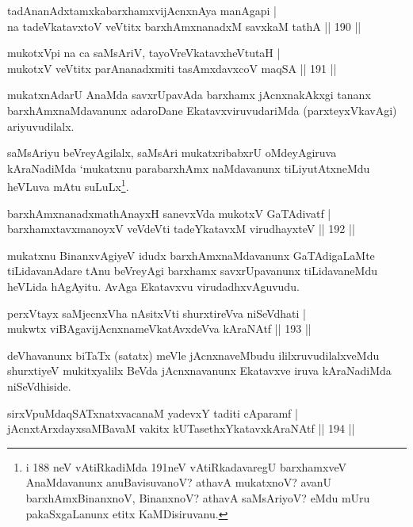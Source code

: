 \begin{shl}
tadAnanAdxtamxkabarxhamxvijAcnxnAya manAgapi |\\
na tadeVkatavxtoV veVtitx barxhAmx\s \s nanadxM savxkaM tathA \hfill || 190 ||
\end{shl}

\begin{shl}
mukotxV\s pi na ca saMsAriV, tayoVreVkatavxheVtutaH |\\
mukotxV veVtitx parAnanadxmiti tasAmxdavxcoV maqSA \hfill || 191 ||
\end{shl}

\begin{artha}
mukatxnAdarU AnaMda savxrUpavAda barxhamx jAcnxnakAkxgi tananx barxhAmxnaMdavanunx adaroDane EkatavxviruvudariMda (parxteyxVkavAgi) ariyuvudilalx.

saMsAriyu beVreyAgilalx, saMsAri mukatxribabxrU oMdeyAgiruva kAraNadiMda `mukatxnu parabarxhAmx naMdavanunx tiLiyutAtxneMdu heVLuva mAtu suLuLx\footnote{i 188 neV vAtiRkadiMda 191neV vAtiRkadavaregU barxhamxveV AnaMdavanunx anuBavisuvanoV? athavA mukatxnoV? avanU barxhAmxBinanxnoV, BinanxnoV? athavA saMsAriyoV? eMdu mUru pakaSxgaLanunx etitx KaMDisiruvanu.}.
\end{artha}

\begin{shl}
barxhAmxnanadxmathAnayxH sanevxVda mukotxV GaTAdivatf |\\
barxhamxtavxmanoyxV veVdeVti tadeYkatavxM virudhayxteV \hfill || 192 ||
\end{shl}

\begin{artha}%
mukatxnu BinanxvAgiyeV idudx barxhAmxnaMdavanunx GaTAdigaLaMte tiLidavanAdare tAnu beVreyAgi barxhamx savxrUpavanunx tiLidavaneMdu heVLida hAgAyitu. AvAga Ekatavxvu virudadhxvAguvudu.
\end{artha}

\begin{shl}
perxVtayx saMjecnxVha nAsitxVti shurxtireVva niSeVdhati |\\
mukwtx viBAgavijAcnxnameVkatAvxdeVva kAraNAtf \hfill || 193 ||
\end{shl}

\begin{artha}
deVhavanunx biTaTx (satatx) meVle jAcnxnaveMbudu  ililxruvudilalxveMdu shurxtiyeV mukitxyalilx BeVda jAcnxnavanunx Ekatavxve iruva kAraNadiMda niSeVdhiside.
\end{artha}

\begin{shl}
sirxVpuMdaqSATxnatxvacanaM yadevxY taditi cAparamf |\\
jAcnxtArxdayxsaMBavaM vakitx kUTasethxYkatavxkAraNAtf \hfill || 194 ||
\end{shl}

